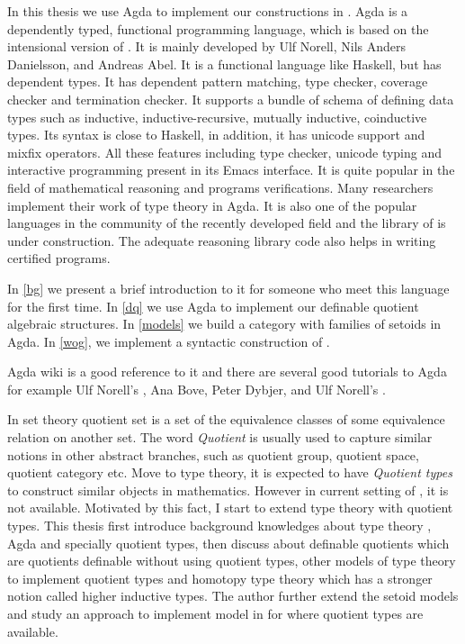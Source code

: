 In this thesis we use Agda to implement our constructions in \itt. 
Agda is a dependently typed, functional programming language, which is
based on the intensional version of \mltt. It is mainly developed by
Ulf Norell, Nils Anders Danielsson, and Andreas Abel.
It is a functional language like Haskell, but has dependent types. It has dependent pattern
matching, type checker, coverage checker and termination checker. It
supports a bundle of schema of defining data types such as inductive, inductive-recursive, mutually inductive,
coinductive types. Its syntax is close to Haskell, in addition, it has
unicode support and mixfix operators. All these features including
type checker, unicode typing and interactive programming present in
its Emacs interface. It is quite popular in the field of mathematical reasoning and programs
verifications. Many researchers implement their work of type theory in
Agda. It is also one of the popular languages in the community of the recently
developed field \hott and the library of \hott is under construction.
The adequate reasoning library code also helps in writing certified programs.

In \autoref{bg} we present a brief introduction to it for someone
who meet this language for the first time. In \autoref{dq} we use Agda to implement our definable quotient algebraic structures. In \autoref{models} we build a category with families of setoids in Agda. In \autoref{wog}, we implement a syntactic construction of \wog.

Agda wiki\cite{agdawiki:main} is a good reference to it and there are
several good tutorials to Agda for example Ulf Norell's
\cite{tutorial}, Ana Bove, Peter Dybjer, and Ulf Norell's \cite{bove2009brief}.
















In set theory quotient set is
a set of the equivalence classes of some equivalence relation on
another set. The word \emph{Quotient} is usually used to capture
similar notions in other abstract branches, such as quotient group,
quotient space, quotient category etc. Move to type theory, it is
expected to have \emph{Quotient types} to construct similar objects in
mathematics. However in current setting of \itt, it is not
available. Motivated by this fact, I start to extend type theory with
quotient types. This thesis first
introduce background knowledges about type theory , Agda and specially
quotient types, then discuss about definable quotients which are
quotients definable without using quotient types, other models of type
theory to implement quotient types and homotopy type theory which has
a stronger notion called higher inductive types. The author further
extend the setoid models and study an approach to implement \wog model
in \itt for \hott where quotient types are available.





